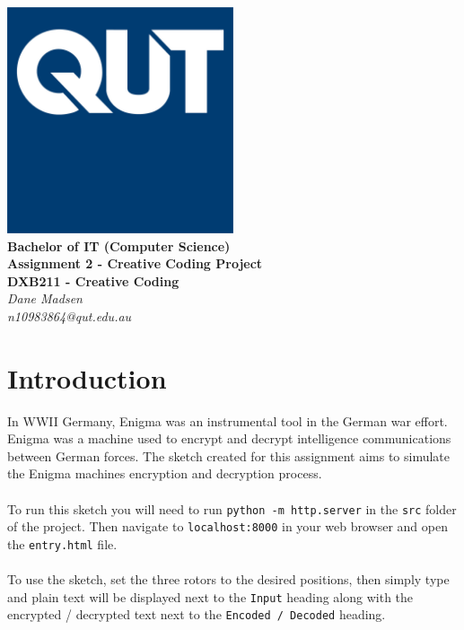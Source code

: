 \documentclass[12pt,a4paper]{article}
\begin{document}
	\begin{titlepage}
		
		\begin{center}
			\includegraphics[width=0.5\textwidth]{QUT.jpg}\\
			[0.03\textheight]  
			\Large\textbf{Bachelor of IT (Computer Science)}\\
			\Large\textbf{Assignment 2 - Creative Coding Project}\\
			\large\textbf{DXB211 - Creative Coding}\\
			[0.02\textheight]
			\large\textsl{Dane Madsen}\\
			\large\textsl{n10983864@qut.edu.au}
		\end{center}
		
	\end{titlepage}
	\tableofcontents
	\newpage

	\section{Introduction}
		In WWII Germany, Enigma was an instrumental tool in the German war effort. 
		Enigma was a machine used to encrypt and decrypt intelligence communications 
		between German forces. The sketch created for this assignment aims to simulate 
		the Enigma machines encryption and decryption process.\\
		\\
		To run this sketch you will need to run \texttt{python -m http.server} in the 
		\texttt{src} folder of the project. Then navigate to \texttt{localhost:8000} 
		in your web browser and open the \texttt{entry.html} file.\\
		\\
		To use the sketch, set the three rotors to the desired positions, then simply 
		type and plain text will be displayed next to the \texttt{Input} heading along 
		with the encrypted / decrypted text next to the \texttt{Encoded / Decoded} 
		heading.\\
\end{document}
